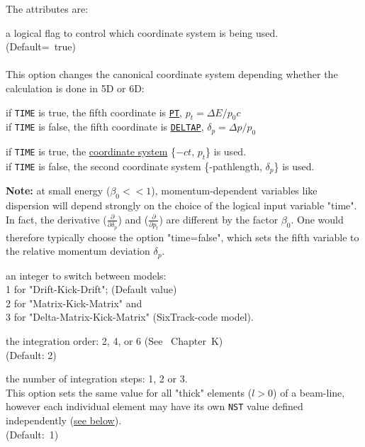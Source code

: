 The attributes are:
\begin{madlist}

   a logical flag to control which coordinate system 
  is being used. \\ (Default=~true) \\ \\
  This option changes the canonical coordinate system depending
  whether the calculation is done in 5D or 6D: 
  \begin{madlist}
     if {\tt TIME} is true, the fifth coordinate is
    \hyperref[subsec:tables_canon]{\tt PT}, $p_t = \Delta E / p_0 c$ \\ 
    if {\tt TIME} is false, the fifth coordinate is
    \hyperref[subsec:tables_canon]{\tt DELTAP}, $\delta_p = \Delta p / p_0$
    
     if {\tt TIME} is true, the \hyperref[subsec:tables_canon]{\madx
      coordinate system} \{$-ct$, $p_t$\} is used. \\   
    if {\tt TIME} is false, the second \ptc coordinate system
    \{-pathlength, $\delta_p$\} is used. 
  \end{madlist}
  
 {\bf Note:} at small energy ($\beta_0 << 1$),
 momentum-dependent variables like dispersion will depend  strongly on
 the choice of  the logical input variable "time".  In fact, the
 derivative ($\frac{\partial}{\partial \delta_p}$)  and
 ($\frac{\partial}{\partial p_t}$)  are different by the
 factor $\beta_0$. One would  therefore typically  choose
 the option "time=false",  which sets the fifth variable to
 the relative momentum deviation $\delta_p$.

   
   an integer to switch between models:\\
  1 for "Drift-Kick-Drift";  (Default value)\\ 
  2 for "Matrix-Kick-Matrix" and \\ 
  3 for "Delta-Matrix-Kick-Matrix" (SixTrack-code model).
     
   the integration order: 2, 4, or 6 (See
  \cite{forest2002}~Chapter~K) \\ (Default: 2)
  
   the number of integration steps: 1, 2 or 3. \\
  This option sets the same value  for all "thick" elements
  ($l > 0$) of a beam-line, however each individual element may have
  its own {\tt NST} value defined independently
  (\hyperref[sec:add_option_PTC]{see below}). \\ 
  (Default:~1)


\end{madlist}
